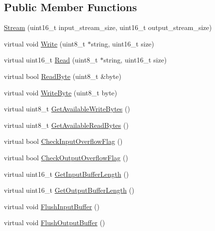 \subsection*{Public Member Functions}
\begin{DoxyCompactItemize}
\item 
\hyperlink{class_stream_a2b738d6f4d3059de2ae3d444d68663bf}{Stream} (uint16\-\_\-t input\-\_\-stream\-\_\-size, uint16\-\_\-t output\-\_\-stream\-\_\-size)
\item 
virtual void \hyperlink{class_stream_a508be3423e4d99ab2757275fb723002a}{Write} (uint8\-\_\-t $\ast$string, uint16\-\_\-t size)
\item 
virtual uint16\-\_\-t \hyperlink{class_stream_a851572e5787cd98383d5118de378724b}{Read} (uint8\-\_\-t $\ast$string, uint16\-\_\-t size)
\item 
virtual bool \hyperlink{class_stream_a6db4180f5834073f992608b856bddca2}{Read\-Byte} (uint8\-\_\-t \&byte)
\item 
virtual void \hyperlink{class_stream_aeaed767b3a8d946c6f81465fa83ff17f}{Write\-Byte} (uint8\-\_\-t byte)
\item 
virtual uint8\-\_\-t \hyperlink{class_stream_a6a16ddb03d3360cef4daf4d38245091d}{Get\-Available\-Write\-Bytes} ()
\item 
virtual uint8\-\_\-t \hyperlink{class_stream_a71cec6c46f3d50cc3ab420e93ae434e1}{Get\-Available\-Read\-Bytes} ()
\item 
virtual bool \hyperlink{class_stream_a088c4e68d568acfad715c56f408fe9f8}{Check\-Input\-Overflow\-Flag} ()
\item 
virtual bool \hyperlink{class_stream_aee6c201819b874c5934a270592d9d311}{Check\-Output\-Overflow\-Flag} ()
\item 
virtual uint16\-\_\-t \hyperlink{class_stream_a4860b9602c68ab437520d321e4e97212}{Get\-Input\-Buffer\-Length} ()
\item 
virtual uint16\-\_\-t \hyperlink{class_stream_ad8aea9131dbc1b422bdba2408d63492a}{Get\-Output\-Buffer\-Length} ()
\item 
virtual void \hyperlink{class_stream_ac7e3629626c1ea4d9cba88db1e048132}{Flush\-Input\-Buffer} ()
\item 
virtual void \hyperlink{class_stream_a0af6193f98fcf7bcd60eef84fce8699c}{Flush\-Output\-Buffer} ()
\end{DoxyCompactItemize}
